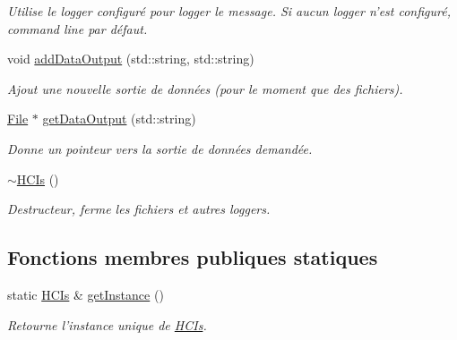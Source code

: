 \begin{DoxyCompactItemize}
\begin{DoxyCompactList}\small\item\em Utilise le logger configuré pour logger le message. Si aucun logger n'est configuré, command line par défaut. \end{DoxyCompactList}\item 
void \hyperlink{classHCIs_afeb0ee7efd2c14dfded566aacb9dc615}{add\-Data\-Output} (std\-::string, std\-::string)
\begin{DoxyCompactList}\small\item\em Ajout une nouvelle sortie de données (pour le moment que des fichiers). \end{DoxyCompactList}\item 
\hyperlink{classFile}{File} $\ast$ \hyperlink{classHCIs_a15b2703edaaf748e452e9d4df4262465}{get\-Data\-Output} (std\-::string)
\begin{DoxyCompactList}\small\item\em Donne un pointeur vers la sortie de données demandée. \end{DoxyCompactList}\item 
\hypertarget{classHCIs_a63d976a06cf358efc31a2692b54a2d45}{\hyperlink{classHCIs_a63d976a06cf358efc31a2692b54a2d45}{$\sim$\-H\-C\-Is} ()}\label{classHCIs_a63d976a06cf358efc31a2692b54a2d45}

\begin{DoxyCompactList}\small\item\em Destructeur, ferme les fichiers et autres loggers. \end{DoxyCompactList}\end{DoxyCompactItemize}
\subsection*{Fonctions membres publiques statiques}
\begin{DoxyCompactItemize}
\item 
\hypertarget{classHCIs_ae18a8eafd21d1490bf59e395a278a0c6}{static \hyperlink{classHCIs}{H\-C\-Is} \& \hyperlink{classHCIs_ae18a8eafd21d1490bf59e395a278a0c6}{get\-Instance} ()}\label{classHCIs_ae18a8eafd21d1490bf59e395a278a0c6}

\begin{DoxyCompactList}\small\item\em Retourne l'instance unique de \hyperlink{classHCIs}{H\-C\-Is}. \end{DoxyCompactList}\end{DoxyCompactItemize}


